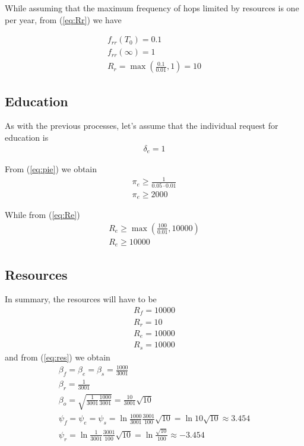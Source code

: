 \documentclass[a4paper,twoside]{article}
\begin{document}
While assuming that the maximum frequency of hops limited by resources is one per year, from (\ref{eq:Rr}) we have

\begin{align*}
	f_{rr}(T_0) = 0.1
	\\
	f_{rr}(\infty) = 1
	\\
	R_r = \max \left( \frac{0.1}{0.01}, 1 \right) = 10
\end{align*}

\subsection{Education}

As with the previous processes, let's assume that the individual request for education is
\begin{align*}
	\delta_e = 1
\end{align*}

From (\ref{eq:pie}) we obtain
\begin{align*}
	\pi_e \ge \frac{1}{0.05 \cdot 0.01}
	\\
	\pi_e \ge 2000
\end{align*}

While from (\ref{eq:Re})
\begin{align*}
	R_e \ge \max \left( \frac{100}{0.01}, 10000 \right)
	\\
	R_e \ge 10000
\end{align*}

\subsection{Resources}

In summary, the resources will have to be
\begin{align*}
	R_f = 10000
	\\
	R_r = 10
	\\
	R_e = 10000
	\\
	R_s = 10000
\end{align*}
and from (\ref{eq:res}) we obtain
\begin{align*}
	\beta_f = \beta_e = \beta_s = \frac{1000}{3001}
	\\
	\beta_r = \frac{1}{3001}
	\\
	\beta_o = \sqrt{\frac{1}{3001} \frac{1000}{3001}}=\frac{10}{3001} \sqrt{10}
	\\
	\psi_f = \psi_e = \psi_s = \ln \frac{1000}{3001} \frac{3001}{100} \sqrt{10}
	=  \ln 10 \sqrt{10} \approx 3.454
	\\
	\psi_r = \ln \frac{1}{3001} \frac{3001}{100} \sqrt{10}
=  \ln \frac{\sqrt{10}}{100} \approx -3.454
\end{align*}
\end{document}
